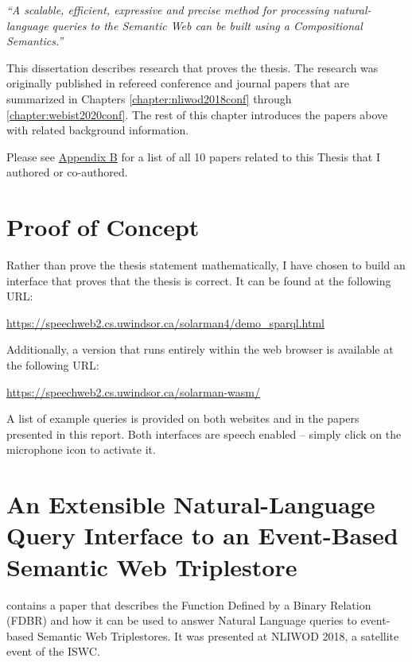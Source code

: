 \documentclass[../main.tex]{subfiles}
\begin{document}
\begin{refsection}
\vspace{0.5em}

\textit{``A scalable, efficient, expressive and precise method for processing natural-language queries to the Semantic Web can be built using a Compositional Semantics.''}

\vspace{0.5em}

This dissertation describes research that proves the thesis. The research was originally published in refereed conference and journal papers that are summarized in Chapters \ref{chapter:nliwod2018conf} through \ref{chapter:webist2020conf}. The rest of this chapter introduces the papers above with related background information.

Please see \hyperref[appendix:b]{Appendix B} for a list of all 10 papers related to this Thesis that I authored or co-authored.

\section{Proof of Concept}

Rather than prove the thesis statement mathematically, I have chosen to build an interface that
proves that the thesis is correct.  It can be found at the following URL:

\begin{center}
    \url{https://speechweb2.cs.uwindsor.ca/solarman4/demo_sparql.html}
\end{center}
Additionally, a version that runs entirely within the web browser is available at
the following URL:
\begin{center}
    \url{https://speechweb2.cs.uwindsor.ca/solarman-wasm/}
\end{center}
A list of example queries is provided on both websites and in the papers presented in this report.
Both interfaces are speech enabled -- simply click on the microphone icon to activate it.

\section{An Extensible Natural-Language Query Interface to an Event-Based Semantic Web Triplestore}

\textbf{} contains a paper that describes the Function Defined by a Binary Relation (FDBR) and how it can be used to answer Natural Language queries to event-based Semantic Web Triplestores.  It was presented at NLIWOD 2018, a satellite event of the ISWC.


\end{refsection}
\end{document}
